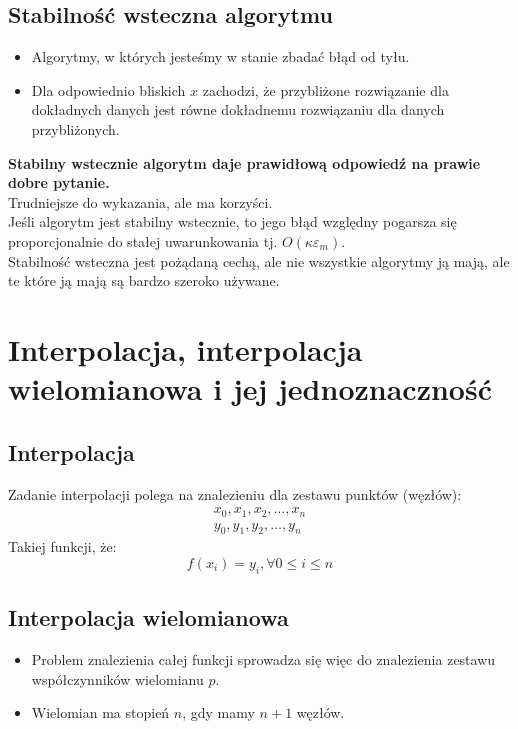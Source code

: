\documentclass[a4paper]{article}
\begin{document}
\subsection{Stabilność wsteczna algorytmu}
\begin{itemize}
    \item Algorytmy, w których jesteśmy w stanie zbadać błąd od tyłu. 
    \item Dla odpowiednio bliskich $x$ zachodzi, że przybliżone rozwiązanie dla dokładnych danych jest równe dokładnemu rozwiązaniu dla danych przybliżonych.
\end{itemize}
\textbf{Stabilny wstecznie algorytm daje prawidłową odpowiedź na prawie dobre pytanie.} \\
Trudniejsze do wykazania, ale ma korzyści. \\
Jeśli algorytm jest stabilny wstecznie, to jego błąd względny pogarsza się proporcjonalnie do stałej uwarunkowania tj. $O(\kappa \varepsilon_m)$. \\
Stabilność wsteczna jest pożądaną cechą, ale nie wszystkie algorytmy ją mają, ale te które ją mają są bardzo szeroko używane.

\section{Interpolacja, interpolacja wielomianowa i jej jednoznaczność}

\subsection{Interpolacja}
Zadanie interpolacji polega na znalezieniu dla zestawu punktów (węzłów):
\begin{equation*}
    \begin{split}
        x_0,x_1,x_2,\ldots ,x_n \\
        y_0,y_1,y_2,\ldots , y_n
    \end{split}
\end{equation*}
Takiej funkcji, że:
\begin{equation*}
    f(x_i)=y_i, \forall 0 \leq i \leq n
\end{equation*}

\subsection{Interpolacja wielomianowa}
\begin{itemize}
    \item Problem znalezienia całej funkcji sprowadza się więc do znalezienia zestawu współczynników wielomianu $p$.
    \item Wielomian ma stopień $n$, gdy mamy $n+1$ węzłów.
\end{itemize}
\end{document}
